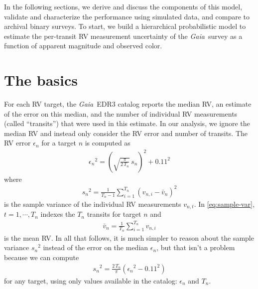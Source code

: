 \documentclass[modern, letterpaper]{aastex631}
\newcommand{\project}[1]{\textsl{#1}}
\newcommand{\Gaia}{\project{Gaia}}
\begin{document}
In the following sections, we derive and discuss the components of this model, validate and characterize the performance using simulated data, and compare to archival binary surveys.
To start, we build a hierarchical probabilistic model to estimate the per-transit RV measurement uncertainty of the \Gaia\ survey as a function of apparent magnitude and observed color.

\section{The basics}
\label{sect:basics}

For each RV target, the \Gaia\ EDR3 catalog reports the median RV, an estimate of the error on this median, and the number of individual RV measurements (called ``transits'') that were used in this estimate.
In our analysis, we ignore the median RV and instead only consider the RV error and number of transits.
The RV error $\epsilon_n$ for a target $n$ is computed as \citep{Katz19}
\begin{eqnarray}\label{eq:rv-error-def}
	{\epsilon_n}^2 = \left(\sqrt{\frac{\pi}{2\,T_n}}\,s_n\right)^2 + 0.11^2
\end{eqnarray}
where
\begin{eqnarray}
	\label{eq:sample-var}
	{s_n}^2 = \frac{1}{T_n-1}\sum_{i=1}^{T_n} \left(v_{n,i} - \bar{v}_n\right)^2
\end{eqnarray}
is the sample variance of the individual RV measurements $v_{n,t}$.
In \autoref{eq:sample-var}, $t=1,\cdots,T_n$ indexes the $T_n$ transits for target $n$ and
\begin{eqnarray}
	\bar{v}_n = \frac{1}{T_n}\sum_{i=1}^{T_n} v_{n,i}
\end{eqnarray}
is the mean RV.
In all that follows, it is much simpler to reason about the sample variance ${s_n}^2$ instead of the error on the median ${\epsilon}_n$, but that isn't a problem because we can compute
\begin{eqnarray}
	{s_n}^2 = \frac{2\,T_n}{\pi}\left({\epsilon_n}^2 - 0.11^2\right)
\end{eqnarray}
for any target, using only values available in the catalog: $\epsilon_n$ and $T_n$.
\end{document}
